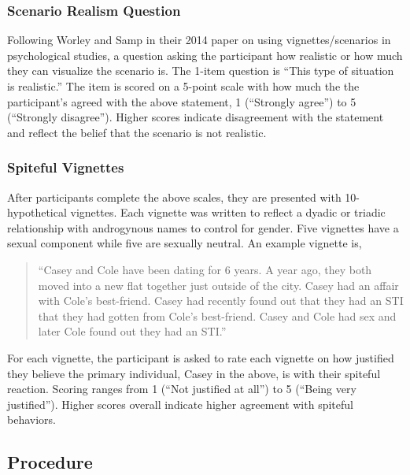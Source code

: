 \documentclass[
  donotrepeattitle,doc, 12pt, a4paper,floatsintext]{apa7}
\begin{document}
\hypertarget{scenario-realism-question}{%
\subsubsection{Scenario Realism Question}\label{scenario-realism-question}}

Following Worley and Samp in their 2014 paper on using vignettes/scenarios in psychological studies, a question asking the participant how realistic or how much they can visualize the scenario is. The 1-item question is ``This type of situation is realistic.'' The item is scored on a 5-point scale with how much the the participant's agreed with the above statement, 1 (``Strongly agree'') to 5 (``Strongly disagree''). Higher scores indicate disagreement with the statement and reflect the belief that the scenario is not realistic.

\hypertarget{spiteful-vignettes}{%
\subsubsection{Spiteful Vignettes}\label{spiteful-vignettes}}

After participants complete the above scales, they are presented with 10-hypothetical vignettes. Each vignette was written to reflect a dyadic or triadic relationship with androgynous names to control for gender. Five vignettes have a sexual component while five are sexually neutral. An example vignette is,

\begin{quote}
``Casey and Cole have been dating for 6 years. A year ago, they both moved into a new flat together just outside of the city. Casey had an affair with Cole's best-friend. Casey had recently found out that they had an STI that they had gotten from Cole's best-friend. Casey and Cole had sex and later Cole found out they had an STI.''
\end{quote}

For each vignette, the participant is asked to rate each vignette on how justified they believe the primary individual, Casey in the above, is with their spiteful reaction. Scoring ranges from 1 (``Not justified at all'') to 5 (``Being very justified''). Higher scores overall indicate higher agreement with spiteful behaviors.

\hypertarget{procedure}{%
\subsection{Procedure}\label{procedure}}
\end{document}
